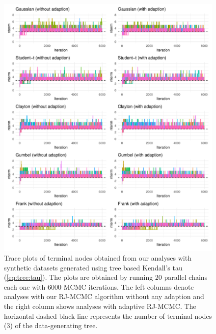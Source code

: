 \documentclass{amsart}
\begin{document}
\begin{figure}
	\centering
	\includegraphics[width = 0.95\linewidth]{"case_1_nterm.pdf"}
	\caption{Trace plots of terminal nodes obtained from our analyses with synthetic datasets generated using tree based Kendall's tau (\cref{eq:tree:tau}). The plots are obtained by running 20 parallel chains each one with 6000 MCMC iterations. The left columns denote analyses with our RJ-MCMC algorithm without any adaption and the right column shows analyses with adaptive RJ-MCMC. The horizontal dashed black line represents the number of terminal nodes (3) of the data-generating tree.}
	\label{fig:trace:nterm:ex1}
\end{figure}
\end{document}
